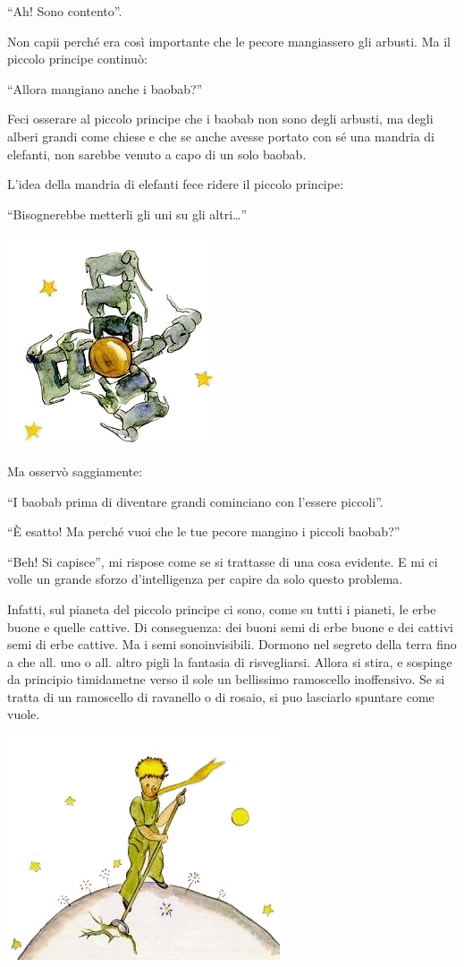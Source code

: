 \documentclass[11pt]{scrbook}
\begin{document}
``Ah! Sono contento''.

Non capii perché era così importante che le pecore mangiassero gli arbusti. Ma il piccolo principe continuò:

``Allora mangiano anche i baobab?''

Feci osserare al piccolo principe che i baobab non sono degli arbusti, ma degli alberi grandi come chiese e che se anche avesse portato con sé una mandria di elefanti, non sarebbe venuto a capo di un solo baobab.

L'idea della mandria di elefanti fece ridere il piccolo principe:

``Bisognerebbe metterli gli uni su gli altri\ldots{}''

\begin{center}
\includegraphics{img/5a}
\end{center}

Ma osservò saggiamente:

``I baobab prima di diventare grandi cominciano con l'essere piccoli''.

``È esatto! Ma perché vuoi che le tue pecore mangino i piccoli baobab?''

``Beh! Si capisce'', mi rispose come se si trattasse di una cosa
evidente. E mi ci volle un grande sforzo d'intelligenza per capire da
solo questo problema.

Infatti, sul pianeta del piccolo principe ci sono, come su tutti i
pianeti, le erbe buone e quelle cattive. Di conseguenza: dei buoni semi
di erbe buone e dei cattivi semi di erbe cattive. Ma i semi
sonoinvisibili. Dormono nel segreto della terra fino a che all. uno o
all. altro pigli la fantasia di risvegliarsi. Allora si stira, e
sospinge da principio timidametne verso il sole un bellissimo ramoscello
inoffensivo. Se si tratta di un ramoscello di ravanello o di rosaio, si
puo lasciarlo spuntare come vuole.

\begin{center}
\includegraphics{img/5b}
\end{center}
\end{document}
